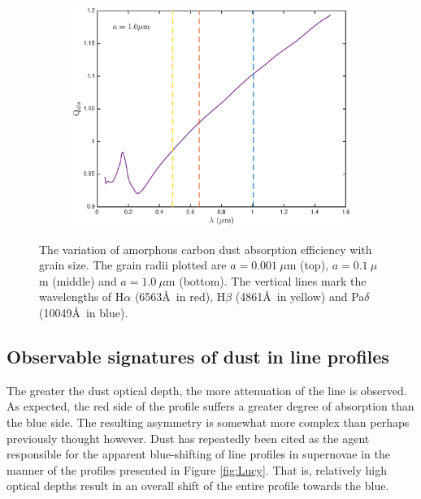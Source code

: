 \begin{figure}
\begin{subfigure}{\textwidth}
\centering
\includegraphics[trim =30 10 45 25,clip=true,scale=0.55]{chapters/chapter4/images/Qabs_a1_0}
\end{subfigure}
\caption{The variation of amorphous carbon dust absorption efficiency with grain size. The grain radii plotted are $a=0.001~\mu$m (top), $a=0.1~\mu$m (middle) and $a=1.0~\mu$m (bottom).  The vertical lines mark the wavelengths of H$\alpha$ (6563\AA\ in red), H$\beta$ (4861\AA\ in yellow) and Pa$\delta$ (10049\AA\ in blue).}
\label{wav_dep2}
\end{figure}






\subsection{Observable signatures of dust in line profiles}
\label{asym}

The greater the dust optical depth, the more attenuation of the line 
is observed.  As expected, the red side of the profile suffers a greater 
degree of absorption than the blue side.  The resulting asymmetry is 
somewhat more complex than perhaps previously thought however.  Dust has 
repeatedly been cited as the agent responsible for the apparent 
blue-shifting of line profiles in supernovae in the manner of the profiles 
presented in Figure \ref{fig:Lucy}.  That is, relatively high optical 
depths result in an overall shift of the entire profile towards the blue.

